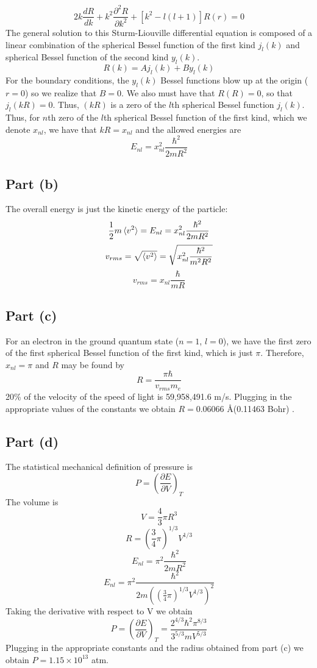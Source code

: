 \documentclass{article}
\begin{document}
\[2k \frac{dR}{dk} + k^2 \frac{\partial^2 R}{\partial k^2} + \left[k^2 - l(l+1) \right] R(r) = 0 \]
The general solution to this Sturm-Liouville differential equation is composed of a linear combination of the spherical Bessel function of the first kind $j_l(k)$ and spherical Bessel function of the second kind $y_l(k)$.
\[ R(k) = Aj_l(k) + By_l(k) \]
For the boundary conditions, the $y_l(k)$ Bessel functions blow up at the origin ($r=0$) so we realize that $B=0$.
We also must have that $R(R) = 0$, so that $j_l(kR) = 0$. Thus, $(kR)$ is a zero of the $l$th spherical Bessel function $j_l(k)$. Thus, for $n$th zero of the $l$th spherical Bessel function of the first kind, which we denote
$x_{nl}$, we have that $kR = x_{nl}$ and the allowed energies are 
\[E_{nl} = x_{nl}^2 \frac{\hbar^2}{2mR^2} \]
\subsection{Part (b)}
The overall energy is just the kinetic energy of the particle:
\[\frac{1}{2}m \braket{v^2} = E_{nl} = x_{nl}^2 \frac{\hbar^2}{2mR^2}\]
\[v_{rms} =  \sqrt{\braket{v^2}} = \sqrt{x_{nl}^2 \frac{\hbar^2}{m^2R^2}}\]
\[v_{rms} = x_{nl} \frac{\hbar}{mR}\]

\subsection{Part (c)}
For an electron in the ground quantum state ($n=1$, $l=0$), 
we have the first zero of the first spherical Bessel function of the first kind, which is just $\pi$.
Therefore, $x_{nl} = \pi$ and $R$ may be found by
\[R = \frac{\pi \hbar}{v_{rms}m_{e}} \]
20\% of the velocity of the speed of light is 59,958,491.6 m/s.
Plugging in the appropriate values of the constants we obtain $R = 0.06066$ \AA (0.11463 Bohr) .


\subsection{Part (d)}
The statistical mechanical definition of pressure is
\[P = \left(\frac{\partial E}{\partial V}\right)_T \]
The volume is
\[V = \frac{4}{3} \pi R^3 \]
\[R = (\frac{3}{4}\pi)^{1/3} V^{1/3} \]
\[E_{nl} = \pi^2 \frac{\hbar^2}{2mR^2} \]
\[E_{nl} = \pi^2 \frac{\hbar^2}{2m((\frac{3}{4}\pi)^{1/3} V^{1/3})^2}\]
Taking the derivative with respect to V we obtain
\[P = \left(\frac{\partial E}{\partial V}\right)_T = \frac{2^{4/3}\hbar^2\pi^{8/3}}{3^{5/3}mV^{5/3}}  \]
Plugging in the appropriate constants and the radius obtained from part (c) we obtain $P = 1.15 \times 10^13$ atm.
\end{document}
